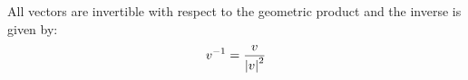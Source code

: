 \begin{lemma}\label{l:invertibility}
	All vectors are invertible with respect to the geometric product and the inverse is given by:
	\[v^{-1} = \frac{v}{\left|v\right|^2}\]
\end{lemma}

